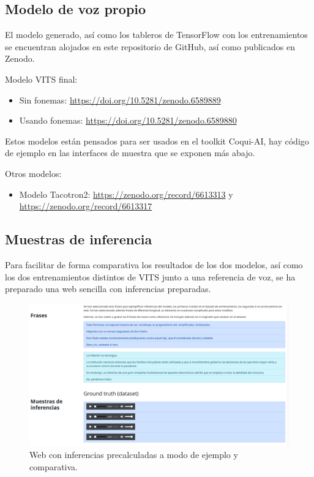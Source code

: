 \subsection{Modelo de voz propio}

El modelo generado, así como los tableros de TensorFlow con los entrenamientos se encuentran alojados en este repositorio de GitHub, así como publicados en Zenodo.

Modelo VITS final:

\begin{itemize}
    \item Sin fonemas: \url{https://doi.org/10.5281/zenodo.6589889}
    \item Usando fonemas: \url{https://doi.org/10.5281/zenodo.6589880}
\end{itemize}

Estos modelos están pensados para ser usados en el toolkit Coqui-AI, hay código de ejemplo en las interfaces de muestra que se exponen más abajo.

Otros modelos:

\begin{itemize}
    \item Modelo Tacotron2: \url{https://zenodo.org/record/6613313} y \url{https://zenodo.org/record/6613317}
\end{itemize}

\subsection{Muestras de inferencia}

Para facilitar de forma comparativa los resultados de los dos modelos, así como los dos entrenamientos distintos de VITS junto a una referencia de voz, se ha preparado una web sencilla con inferencias preparadas.

\begin{figure}[H]
\centering
\includegraphics[width=14cm]{8_entregables_img/infer-sample-0.png}
\caption{Web con inferencias precalculadas a modo de ejemplo y comparativa.}
\label{fig:figure1}
\end{figure}


